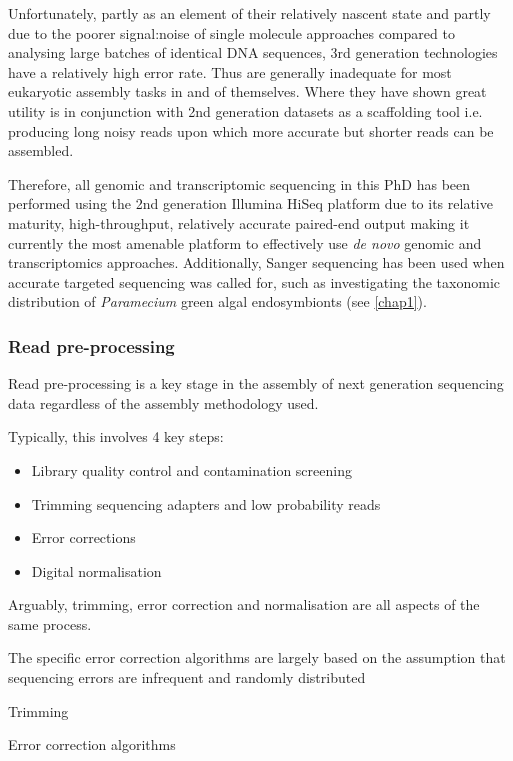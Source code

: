 Unfortunately, partly as an element of their relatively nascent state and partly due to the
poorer signal:noise of single molecule approaches compared to analysing large 
batches of identical DNA sequences, 3rd generation technologies have a relatively high error rate.
Thus are generally inadequate for most eukaryotic assembly tasks in and of themselves.
Where they have shown great utility is in conjunction with 2nd generation datasets
as a scaffolding tool i.e. producing long noisy reads upon which more accurate but shorter
reads can be assembled.


Therefore, all genomic and transcriptomic sequencing in this PhD has been performed using the 2nd generation
Illumina HiSeq platform due to its relative maturity, high-throughput, relatively accurate
paired-end output making it currently the most amenable platform to effectively
use \textit{de novo} genomic and transcriptomics approaches.  Additionally, Sanger sequencing
has been used when accurate targeted sequencing was called for, such as investigating the
taxonomic distribution of \textit{Paramecium} green algal endosymbionts (see \ref{chap1}).


\subsubsection{Read pre-processing}

Read pre-processing is a key stage in the assembly of next generation sequencing data regardless of the assembly
methodology used. 

Typically, this involves 4 key steps:
\begin{itemize}
    \item Library quality control and contamination screening
    \item Trimming sequencing adapters and low probability reads
    \item Error corrections
    \item Digital normalisation
\end{itemize}


Arguably, trimming, error correction and normalisation are all aspects of the same process.


The specific error correction algorithms are largely based on the assumption that sequencing errors
are infrequent and randomly distributed 




Trimming

Error correction algorithms 

